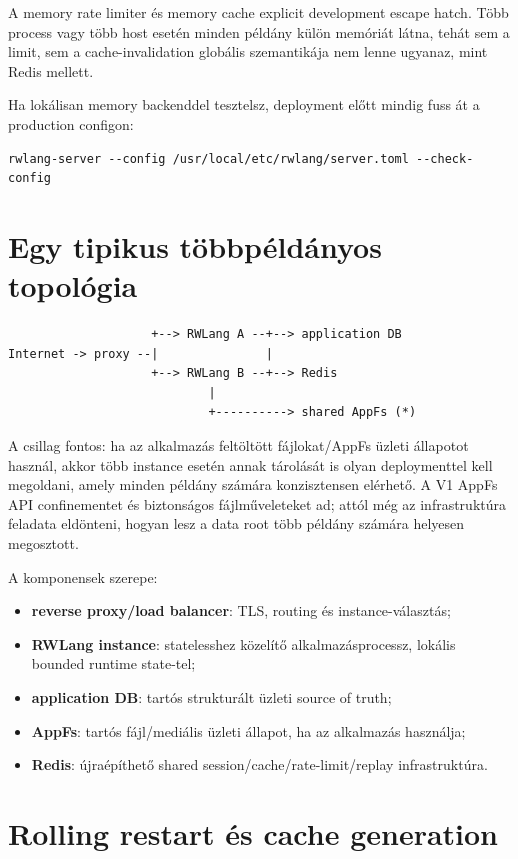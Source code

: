 A memory rate limiter és memory cache explicit development escape hatch. Több process vagy több host esetén minden példány külön memóriát látna, tehát sem a limit, sem a cache-invalidation globális szemantikája nem lenne ugyanaz, mint Redis mellett.

Ha lokálisan memory backenddel tesztelsz, deployment előtt mindig fuss át a production configon:

\begin{lstlisting}
rwlang-server --config /usr/local/etc/rwlang/server.toml --check-config
\end{lstlisting}

\section{Egy tipikus többpéldányos topológia}

\begin{lstlisting}
                    +--> RWLang A --+--> application DB
Internet -> proxy --|               |
                    +--> RWLang B --+--> Redis
                            |
                            +----------> shared AppFs (*)
\end{lstlisting}

A csillag fontos: ha az alkalmazás feltöltött fájlokat/AppFs üzleti állapotot használ, akkor több instance esetén annak tárolását is olyan deploymenttel kell megoldani, amely minden példány számára konzisztensen elérhető. A V1 AppFs API confinementet és biztonságos fájlműveleteket ad; attól még az infrastruktúra feladata eldönteni, hogyan lesz a data root több példány számára helyesen megosztott.

A komponensek szerepe:

\begin{itemize}
  \item \textbf{reverse proxy/load balancer}: TLS, routing és instance-választás;
  \item \textbf{RWLang instance}: statelesshez közelítő alkalmazásprocessz, lokális bounded runtime state-tel;
  \item \textbf{application DB}: tartós strukturált üzleti source of truth;
  \item \textbf{AppFs}: tartós fájl/mediális üzleti állapot, ha az alkalmazás használja;
  \item \textbf{Redis}: újraépíthető shared session/cache/rate-limit/replay infrastruktúra.
\end{itemize}

\section{Rolling restart és cache generation}

